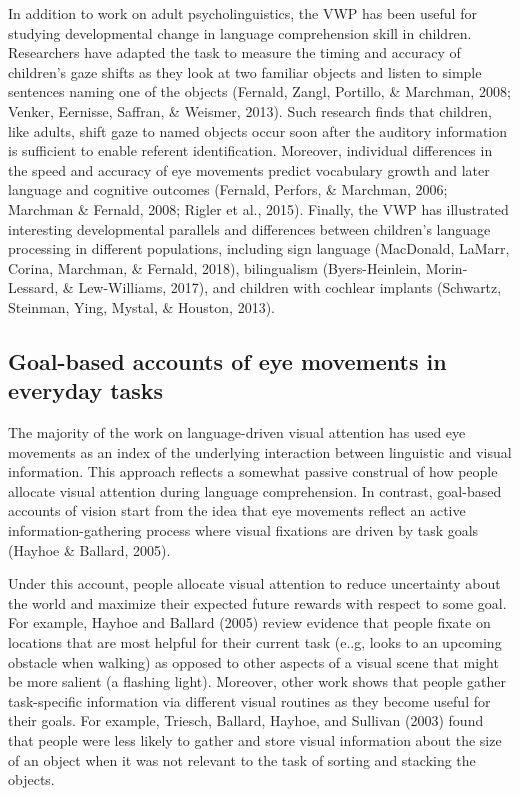 \documentclass[english,floatsintext,man]{apa6}
\begin{document}
In addition to work on adult psycholinguistics, the VWP has been useful
for studying developmental change in language comprehension skill in
children. Researchers have adapted the task to measure the timing and
accuracy of children's gaze shifts as they look at two familiar objects
and listen to simple sentences naming one of the objects (Fernald,
Zangl, Portillo, \& Marchman, 2008; Venker, Eernisse, Saffran, \&
Weismer, 2013). Such research finds that children, like adults, shift
gaze to named objects occur soon after the auditory information is
sufficient to enable referent identification. Moreover, individual
differences in the speed and accuracy of eye movements predict
vocabulary growth and later language and cognitive outcomes (Fernald,
Perfors, \& Marchman, 2006; Marchman \& Fernald, 2008; Rigler et al.,
2015). Finally, the VWP has illustrated interesting developmental
parallels and differences between children's language processing in
different populations, including sign language (MacDonald, LaMarr,
Corina, Marchman, \& Fernald, 2018), bilingualism (Byers-Heinlein,
Morin-Lessard, \& Lew-Williams, 2017), and children with cochlear
implants (Schwartz, Steinman, Ying, Mystal, \& Houston, 2013).

\hypertarget{goal-based-accounts-of-eye-movements-in-everyday-tasks}{%
\subsection{Goal-based accounts of eye movements in everyday
tasks}\label{goal-based-accounts-of-eye-movements-in-everyday-tasks}}

The majority of the work on language-driven visual attention has used
eye movements as an index of the underlying interaction between
linguistic and visual information. This approach reflects a somewhat
passive construal of how people allocate visual attention during
language comprehension. In contrast, goal-based accounts of vision start
from the idea that eye movements reflect an active information-gathering
process where visual fixations are driven by task goals (Hayhoe \&
Ballard, 2005).

Under this account, people allocate visual attention to reduce
uncertainty about the world and maximize their expected future rewards
with respect to some goal. For example, Hayhoe and Ballard (2005) review
evidence that people fixate on locations that are most helpful for their
current task (e..g, looks to an upcoming obstacle when walking) as
opposed to other aspects of a visual scene that might be more salient (a
flashing light). Moreover, other work shows that people gather
task-specific information via different visual routines as they become
useful for their goals. For example, Triesch, Ballard, Hayhoe, and
Sullivan (2003) found that people were less likely to gather and store
visual information about the size of an object when it was not relevant
to the task of sorting and stacking the objects.
\end{document}
